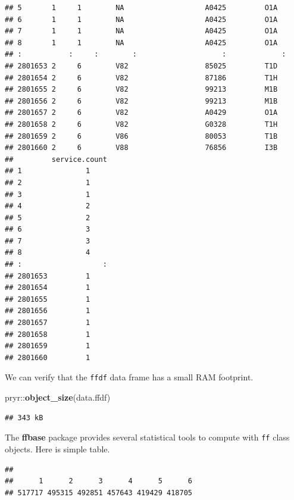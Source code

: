 \documentclass[]{book}
\newenvironment{Shaded}{\begin{snugshade}}{\end{snugshade}}
\newcommand{\KeywordTok}[1]{\textcolor[rgb]{0.13,0.29,0.53}{\textbf{{#1}}}}
\newcommand{\NormalTok}[1]{{#1}}
\theoremstyle{definition}
\theoremstyle{definition}
\theoremstyle{remark}
\begin{document}
\begin{verbatim}
## 5       1     1        NA                   A0425         O1A  
## 6       1     1        NA                   A0425         O1A  
## 7       1     1        NA                   A0425         O1A  
## 8       1     1        NA                   A0425         O1A  
## :           :     :        :                    :             :
## 2801653 2     6        V82                  85025         T1D  
## 2801654 2     6        V82                  87186         T1H  
## 2801655 2     6        V82                  99213         M1B  
## 2801656 2     6        V82                  99213         M1B  
## 2801657 2     6        V82                  A0429         O1A  
## 2801658 2     6        V82                  G0328         T1H  
## 2801659 2     6        V86                  80053         T1B  
## 2801660 2     6        V88                  76856         I3B  
##         service.count
## 1               1    
## 2               1    
## 3               1    
## 4               2    
## 5               2    
## 6               3    
## 7               3    
## 8               4    
## :                   :
## 2801653         1    
## 2801654         1    
## 2801655         1    
## 2801656         1    
## 2801657         1    
## 2801658         1    
## 2801659         1    
## 2801660         1
\end{verbatim}

We can verify that the \texttt{ffdf} data frame has a small RAM
footprint.

\begin{Shaded}
\begin{Highlighting}[]
\NormalTok{pryr::}\KeywordTok{object_size}\NormalTok{(data.ffdf)}
\end{Highlighting}
\end{Shaded}

\begin{verbatim}
## 343 kB
\end{verbatim}

The \textbf{ffbase} package provides several statistical tools to
compute with \texttt{ff} class objects. Here is simple table.

\begin{Shaded}
\end{Shaded}

\begin{verbatim}
## 
##      1      2      3      4      5      6 
## 517717 495315 492851 457643 419429 418705
\end{verbatim}
\end{document}
